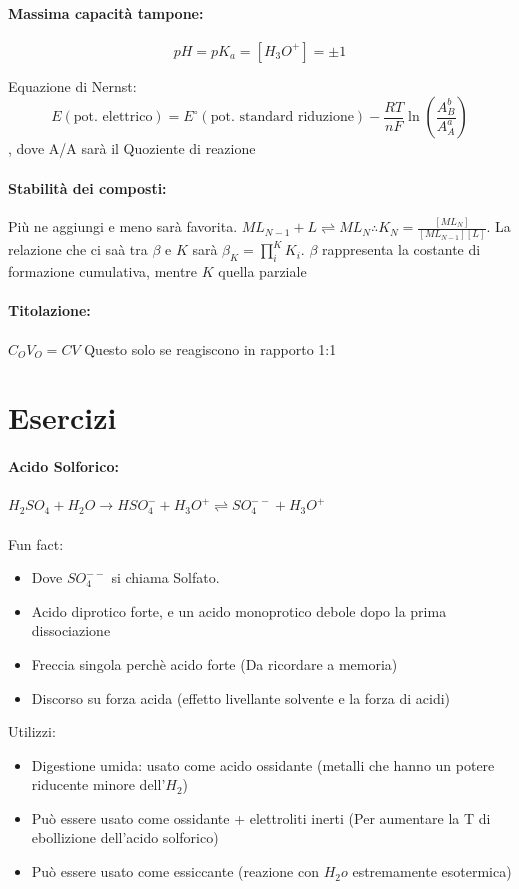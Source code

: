 \documentclass{article}
\begin{document}
\paragraph{Massima capacità tampone: } $$pH = pK_a = [H_3O^+] = \pm 1$$

Equazione di Nernst: $$E (\text{pot. elettrico}) = E^\circ (\text{pot. standard riduzione}) - \frac{RT}{nF} \ln\left(\frac{A^b_B}{A^a_A}\right)$$, dove A/A sarà il Quoziente di reazione

\paragraph{Stabilità dei composti: } Più ne aggiungi e meno sarà favorita. $ML_{N-1} + L \rightleftharpoons ML_N \therefore K_N=\frac{[ML_N]}{[ML_{N-1}] [L]}$. La relazione che ci saà tra $\beta$ e $K$
sarà $\beta_K = \prod_i^KK_i$. $\beta$ rappresenta la costante di formazione cumulativa, mentre $K$ quella parziale

\paragraph{Titolazione: } $C_OV_O = CV$ Questo solo se reagiscono in rapporto 1:1

\newpage
\section{Esercizi}
\paragraph{Acido Solforico: } $H_2SO_4 + H_2O \rightarrow HSO_4^- + H_3O^+ \rightleftharpoons SO_4^{--} + H_3O^+$ 
\\\\
Fun fact:
\begin{itemize}
	\item Dove $SO_4^{--}$ si chiama Solfato.
	\item Acido diprotico forte, e un acido monoprotico debole dopo la prima dissociazione
	\item Freccia singola perchè acido forte (Da ricordare a memoria)
	\item Discorso su forza acida (effetto livellante solvente e la forza di acidi)
\end{itemize}
%
Utilizzi:
\begin{itemize}
	\item Digestione umida: usato come acido ossidante (metalli che hanno un potere riducente minore dell'$H_2$)
	\item Può essere usato come ossidante + elettroliti inerti (Per aumentare la T di ebollizione dell'acido solforico)
	\item Può essere usato come essiccante (reazione con $H_2o$ estremamente esotermica)
\end{itemize}
\hrulefill
\end{document}
